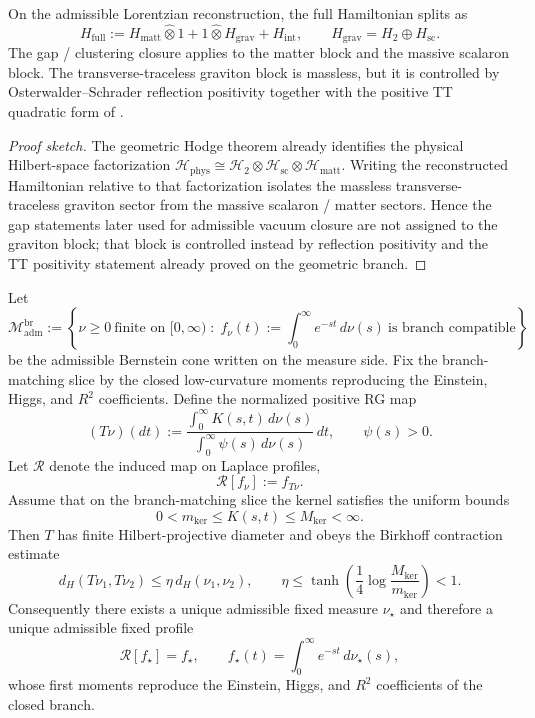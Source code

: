 
\begin{theorem}
\label{thm:sectorial-hamilton-decomposition}
On the admissible Lorentzian reconstruction, the full Hamiltonian splits as
\[
H_{\mathrm{full}}
:=
H_{\mathrm{matt}}\widehat\otimes 1
+
1\widehat\otimes H_{\mathrm{grav}}
+
H_{\mathrm{int}},
\qquad
H_{\mathrm{grav}}=H_{2}\oplus H_{\mathrm{sc}}.
\]
The gap / clustering closure applies to the matter block and the massive scalaron block. The
transverse-traceless graviton block is massless, but it is controlled by Osterwalder--Schrader
reflection positivity together with the positive TT quadratic form of
.
\end{theorem}

\begin{proof}[Proof sketch]
The geometric Hodge theorem already identifies the physical Hilbert-space factorization
$\mathcal H_{\mathrm{phys}}\cong\mathcal H_2\otimes\mathcal H_{\mathrm{sc}}\otimes\mathcal H_{\mathrm{matt}}$.
Writing the reconstructed Hamiltonian relative to that factorization isolates the massless
transverse-traceless graviton sector from the massive scalaron / matter sectors. Hence the gap
statements later used for admissible vacuum closure are not assigned to the graviton block; that
block is controlled instead by reflection positivity and the TT positivity statement already proved
on the geometric branch.
\end{proof}

\begin{theorem}
\label{thm:geometric-uv-fixed-point}
Let
\[
\mathcal M_{\mathrm{adm}}^{\mathrm{br}}
:=
\left\{
\nu\ge 0\ \text{finite on }[0,\infty)\;:\;
f_\nu(t):=\int_0^\infty e^{-st}\,d\nu(s)\ \text{is branch compatible}
\right\}
\]
be the admissible Bernstein cone written on the measure side. Fix the branch-matching slice by the
closed low-curvature moments reproducing the Einstein, Higgs, and $R^2$ coefficients. Define the
normalized positive RG map
\[
(T\nu)(dt)
:=
\frac{\int_0^\infty K(s,t)\,d\nu(s)}{\int_0^\infty \psi(s)\,d\nu(s)}\,dt,
\qquad
\psi(s)>0.
\]
Let $\mathcal R$ denote the induced map on Laplace profiles,
\[
\mathcal R[f_\nu]:=f_{T\nu}.
\]
Assume that on the branch-matching slice the kernel satisfies the uniform bounds
\[
0<m_{\mathrm{ker}}\le K(s,t)\le M_{\mathrm{ker}}<\infty.
\]
Then $T$ has finite Hilbert-projective diameter and obeys the Birkhoff contraction estimate
\[
d_H(T\nu_1,T\nu_2)
\le
\eta\,d_H(\nu_1,\nu_2),
\qquad
\eta\le
\tanh\!\left(\frac14\log\frac{M_{\mathrm{ker}}}{m_{\mathrm{ker}}}\right)<1.
\]
Consequently there exists a unique admissible fixed measure $\nu_\star$ and therefore a unique
admissible fixed profile
\[
\mathcal R[f_\star]=f_\star,
\qquad
f_\star(t)=\int_0^\infty e^{-st}\,d\nu_\star(s),
\]
whose first moments reproduce the Einstein, Higgs, and $R^2$ coefficients of the closed branch.
\end{theorem}

